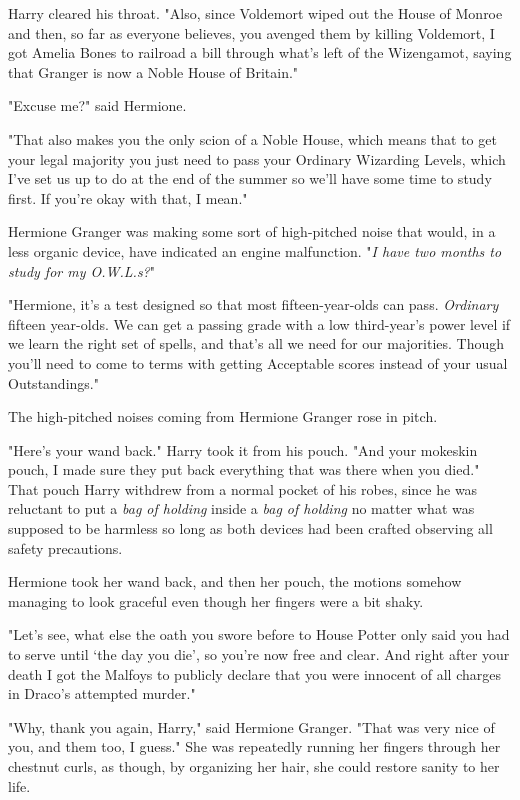 Harry cleared his throat. "Also, since Voldemort wiped out the House of Monroe
and then, so far as everyone believes, you avenged them by killing Voldemort, I
got Amelia Bones to railroad a bill through what's left of the Wizengamot,
saying that Granger is now a Noble House of Britain."

"Excuse me?" said Hermione.

"That also makes you the only scion of a Noble House, which means that to get
your legal majority you just need to pass your Ordinary Wizarding Levels, which
I've set us up to do at the end of the summer so we'll have some time to study
first. If you're okay with that, I mean."

Hermione Granger was making some sort of high-pitched noise that would, in a
less organic device, have indicated an engine malfunction. "\emph{I have two
months to study for my O.W.L.s?}"

"Hermione, it's a test designed so that most fifteen-year-olds can pass.
\emph{Ordinary} fifteen year-olds. We can get a passing grade with a low
third-year's power level if we learn the right set of spells, and that's all we
need for our majorities. Though you'll need to come to terms with getting
Acceptable scores instead of your usual Outstandings."

The high-pitched noises coming from Hermione Granger rose in pitch.

"Here's your wand back." Harry took it from his pouch. "And your mokeskin
pouch, I made sure they put back everything that was there when you died." That
pouch Harry withdrew from a normal pocket of his robes, since he was reluctant
to put a \emph{bag of holding} inside a \emph{bag of holding} no matter what
was supposed to be harmless so long as both devices had been crafted observing
all safety precautions.

Hermione took her wand back, and then her pouch, the motions somehow managing
to look graceful even though her fingers were a bit shaky.

"Let's see, what else{\el} the oath you swore before to House Potter only
said you had to serve until `the day you die', so you're now free and clear.
And right after your death I got the Malfoys to publicly declare that you were
innocent of all charges in Draco's attempted murder."

"Why, thank you again, Harry," said Hermione Granger. "That was very nice of
you, and them too, I guess." She was repeatedly running her fingers through her
chestnut curls, as though, by organizing her hair, she could restore sanity to
her life.

